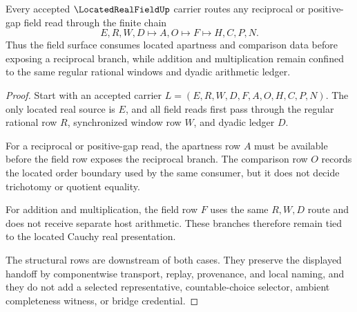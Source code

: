 \begin{theorem}
\label{thm:located-real-field-apartness-field-handoff}
Every accepted $\LocatedRealFieldUp$ carrier routes any reciprocal or positive-gap field read through the finite chain
$$
E,R,W,D\longmapsto A,O\longmapsto F\longmapsto H,C,P,N .
$$
Thus the field surface consumes located apartness and comparison data before exposing a reciprocal branch, while addition and multiplication remain confined to the same regular rational windows and dyadic arithmetic ledger.
\end{theorem}
\begin{proof}
Start with an accepted carrier $L=(E,R,W,D,F,A,O,H,C,P,N)$. The only located real source is $E$, and all field reads first pass through the regular rational row $R$, synchronized window row $W$, and dyadic ledger $D$.

For a reciprocal or positive-gap read, the apartness row $A$ must be available before the field row exposes the reciprocal branch. The comparison row $O$ records the located order boundary used by the same consumer, but it does not decide trichotomy or quotient equality.

For addition and multiplication, the field row $F$ uses the same $R,W,D$ route and does not receive separate host arithmetic. These branches therefore remain tied to the located Cauchy real presentation.

The structural rows are downstream of both cases. They preserve the displayed handoff by componentwise transport, replay, provenance, and local naming, and they do not add a selected representative, countable-choice selector, ambient completeness witness, or bridge credential.
\end{proof}

\begin{closurestatus}{\LocatedRealFieldUp}
  \theoryclosure{\seedClosure}
  \formalstatus{\unformalizedV}
\end{closurestatus}
